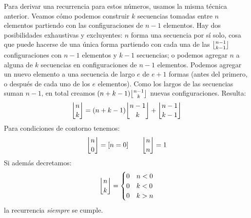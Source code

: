   Para derivar una recurrencia para estos números,%
  usamos la misma técnica anterior.
  Veamos cómo podemos construir
  \(k\) secuencias tomadas entre \(n\) elementos
  partiendo con las configuraciones de \(n - 1\) elementos.
  Hay dos posibilidades exhaustivas y excluyentes:
  \(n\) forma una secuencia por sí solo,
  cosa que puede hacerse de una única forma
  partiendo
  con cada una de las \(\lah{n - 1}{k - 1}\) configuraciones
  con \(n - 1\) elementos y \(k - 1\) secuencias;
  o podemos agregar \(n\) a alguna de \(k\) secuencias
  en configuraciones de \(n - 1\) elementos.
  Podemos agregar un nuevo elemento a una secuencia de largo \(e\)
  de \(e + 1\) formas
  (antes del primero,
   o después de cada uno de los \(e\) elementos).
  Como los largos de las secuencias suman \(n - 1\),
  en total
  creamos \((n + k - 1) \lah{n - 1}{k}\) nuevas configuraciones.
  Resulta:
  \begin{equation}
    \label{eq:recurrence-Lah}
    \lah{n}{k}
      = (n + k - 1) \lah{n - 1}{k} + \lah{n - 1}{k - 1}
  \end{equation}
  Para condiciones de contorno tenemos:
  \begin{equation*}
    \lah{n}{0}
      = [n = 0]
    \qquad
    \lah{n}{n}
      = 1
  \end{equation*}
  Si además decretamos:
  \begin{equation*}
    \lah{n}{k} =
      \begin{cases}
	0 & n < 0 \\
	0 & k < 0 \\
	0 & k > n
      \end{cases}
  \end{equation*}
  la recurrencia \emph{siempre} se cumple.

